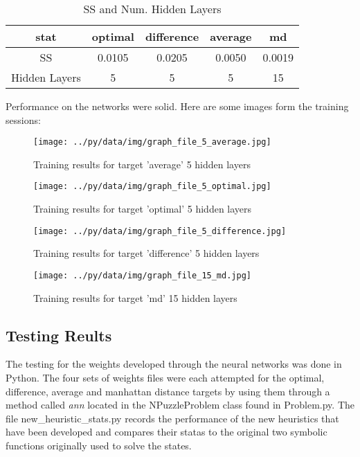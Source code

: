 \documentclass[a4, 12pt]{article}
\begin{document}
\begin{table}[H]
\centering
\caption{SS and Num. Hidden Layers}
\begin{tabular}{c c c c c }\hline 
\hline
 stat & optimal & difference & average & md \\
\hline
 SS & 0.0105& 0.0205& 0.0050 & 0.0019 \\
 Hidden Layers & 5 &5  & 5 &  15 \\
\hline
\end{tabular}
\end{table}

Performance on the networks were solid. Here are some images form the training sessions: \\

 \begin{figure}[h!]
      \centering
      \texttt{[image: ../py/data/img/graph\_file\_5\_average.jpg]}
      \caption{Training results for target 'average' 5 hidden layers}
      \label{overflow}
 \end{figure}
     
 \begin{figure}[h!]
      \centering
      \texttt{[image: ../py/data/img/graph\_file\_5\_optimal.jpg]}
      \caption{Training results for target 'optimal' 5 hidden layers}
      \label{overflow}
 \end{figure}

    
 \begin{figure}[h!]
      \centering
      \texttt{[image: ../py/data/img/graph\_file\_5\_difference.jpg]}
      \caption{Training results for target 'difference' 5 hidden layers}
      \label{overflow}
 \end{figure}

 \begin{figure}[h!]
      \centering
      \texttt{[image: ../py/data/img/graph\_file\_15\_md.jpg]}
      \caption{Training results for target 'md' 15 hidden layers}
      \label{overflow}
 \end{figure}

\subsection{Testing Reults}
The testing for the weights developed through the neural networks was done in Python. The four sets of weights files were each attempted for the optimal, difference, average and manhattan distance targets by using them through a method called \textit{ann} located in the NPuzzleProblem class found in Problem.py. The file new\_heuristic\_stats.py records the performance of the new heuristics that have been developed and compares their statas to the original two symbolic functions originally used to solve the states. \\
\end{document}
